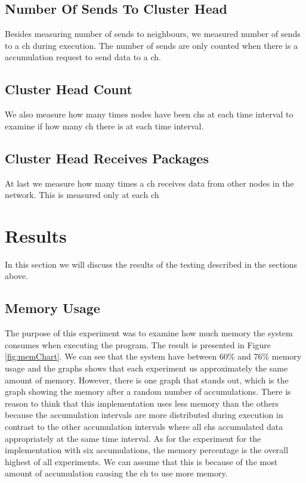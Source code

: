 \documentclass[USenglish]{uit-thesis}
\begin{document}
\subsection{Number Of Sends To Cluster Head}
Besides measuring number of sends to neighbours, we measured number of sends to a \gls{ch} during execution. The number of sends are only counted when there is a accumulation request to send data to a \gls{ch}.


\subsection{Cluster Head Count}
We also measure how many times nodes have been \gls{ch}s at each time interval to examine if how many \gls{ch} there is at each time interval.

\subsection{Cluster Head Receives Packages}
At last we measure how many times a \gls{ch} receives data from other nodes in the network. This is measured only at each \gls{ch}


\section{Results}

In this section we will discuss the results of the testing described in the sections above.

\subsection{Memory Usage}
The purpose of this experiment was to examine how much memory the system consumes when executing the program. The result is presented in Figure \ref{fig:memChart}. We can see that the system have between 60\% and 76\% memory usage and the graphs shows that each experiment us approximately the same amount of memory. However, there is one graph that stands out, which is the graph showing the memory after a random number of accumulations.
There is reason to think that this implementation uses less memory than the others because the accumulation intervals are more distributed during execution in contrast to the other accumulation intervals where all \gls{ch}s accumulated data appropriately at the same time interval. As for the experiment for the implementation with six accumulations, the memory percentage is the overall highest of all experiments. We can assume that this is because of the most amount of accumulation causing the \gls{ch} to use more memory.
\end{document}

